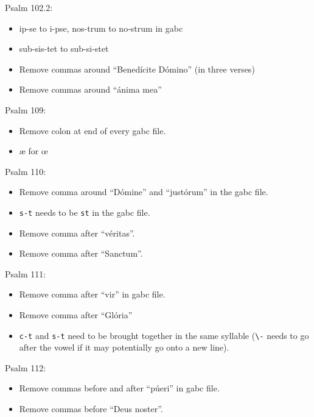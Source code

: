\documentclass[11pt]{article}
\begin{document}
 Psalm 102.2:
  \begin{itemize}
  \item ip-se to i-pse, nos-trum to no-strum in gabc
  \item  sub-sis-tet to sub-si-stet
  \item
 Remove commas around  ``Benedícite Dómino'' (in three verses)
\item
 Remove commas around ``ánima mea''
    \end{itemize}

 
Psalm 109:
\begin{itemize}
\item Remove colon at end of every gabc file.
\item æ for œ
\end{itemize}
 
 Psalm 110:
\begin{itemize}
\item Remove comma around ``Dómine'' and ``justórum''  in the gabc file.
\item
 \texttt{s-t} needs to be  \texttt{st} in the gabc file.
\item Remove comma after ``véritas''.
\item Remove comma after ``Sanctum''.
\end{itemize}

 Psalm 111:
\begin{itemize}
\item
Remove comma after ``vir'' in gabc file.
\item Remove comma after ``Glória''
\item \texttt{c-t} and \texttt{s-t} need to be brought together in the same syllable (\verb|\-| needs to go after the vowel if it may potentially go onto a new line).
\end{itemize}

 Psalm 112:
  \begin{itemize}
\item Remove commas before and after ``púeri'' in gabc file.
\item Remove commas before ``Deus noster''.
 \end{itemize}
 
\end{document}

